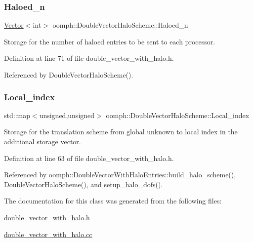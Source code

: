 \subsubsection{\texorpdfstring{Haloed\+\_\+n}{Haloed\_n}}
{\footnotesize\ttfamily \hyperlink{classoomph_1_1Vector}{Vector}$<$int$>$ oomph\+::\+Double\+Vector\+Halo\+Scheme\+::\+Haloed\+\_\+n\hspace{0.3cm}{\ttfamily [private]}}



Storage for the number of haloed entries to be sent to each processor. 



Definition at line 71 of file double\+\_\+vector\+\_\+with\+\_\+halo.\+h.



Referenced by Double\+Vector\+Halo\+Scheme().

\mbox{\label{classoomph_1_1DoubleVectorHaloScheme_aa7dd736a03c4a605e7e4c0e9499154d4}} 
\subsubsection{\texorpdfstring{Local\+\_\+index}{Local\_index}}
{\footnotesize\ttfamily std\+::map$<$unsigned,unsigned$>$ oomph\+::\+Double\+Vector\+Halo\+Scheme\+::\+Local\+\_\+index\hspace{0.3cm}{\ttfamily [private]}}



Storage for the translation scheme from global unknown to local index in the additional storage vector. 



Definition at line 63 of file double\+\_\+vector\+\_\+with\+\_\+halo.\+h.



Referenced by oomph\+::\+Double\+Vector\+With\+Halo\+Entries\+::build\+\_\+halo\+\_\+scheme(), Double\+Vector\+Halo\+Scheme(), and setup\+\_\+halo\+\_\+dofs().



The documentation for this class was generated from the following files\+:\begin{DoxyCompactItemize}
\item 
\hyperlink{double__vector__with__halo_8h}{double\+\_\+vector\+\_\+with\+\_\+halo.\+h}\item 
\hyperlink{double__vector__with__halo_8cc}{double\+\_\+vector\+\_\+with\+\_\+halo.\+cc}\end{DoxyCompactItemize}
